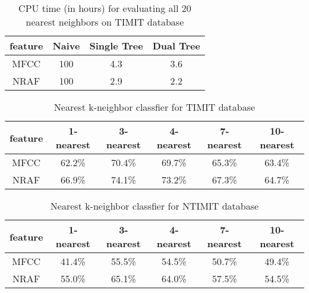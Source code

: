 \documentclass[12pt,letterpaper,doublespaced,ETD,dvips,proposal]{gtthesis}
\begin{document}
\begin{Body}



\begin{table}[h!]
\footnotesize{ \centering
\begin{tabular}{|c|c|c|c|}
  \hline
  feature & Naive & Single Tree & Dual Tree \\
  \hline
  MFCC & 100 & 4.3 & 3.6 \\
  NRAF & 100 & 2.9 & 2.2 \\
  \hline
\end{tabular}
 \caption {CPU time (in hours) for evaluating all 20 nearest neighbors on
  TIMIT database}
  }
  \label{timing}
\end{table}

\begin{table}[htb]
\footnotesize{ \centering
\begin{tabular}{|c|c|c|c|c|c|}
  \hline
  feature & 1-nearest & 3-nearest & 4-nearest & 7-nearest & 10-nearest \\
  \hline
  MFCC & 62.2\% & 70.4\% & 69.7\% & 65.3\% & 63.4\% \\
  NRAF & 66.9\% & 74.1\% & 73.2\% & 67.3\% & 64.7\% \\
  \hline
\end{tabular}
\caption{Nearest k-neighbor classfier for TIMIT database} }
\label{kneighborTIMIT}
\end{table}

\begin{table}[htb]
\footnotesize{ \centering
\begin{tabular}{|c|c|c|c|c|c|}
  \hline
  feature & 1-nearest & 3-nearest & 4-nearest & 7-nearest & 10-nearest \\
  \hline
  MFCC & 41.4\% & 55.5\% & 54.5\% & 50.7\% & 49.4\% \\
  NRAF & 55.0\% & 65.1\% & 64.0\% & 57.5\% & 54.5\% \\
  \hline
\end{tabular}
\caption{Nearest k-neighbor classfier for NTIMIT database} }
\label{kneighborNTIMIT}
\end{table}


\end{Body}
\end{document}
